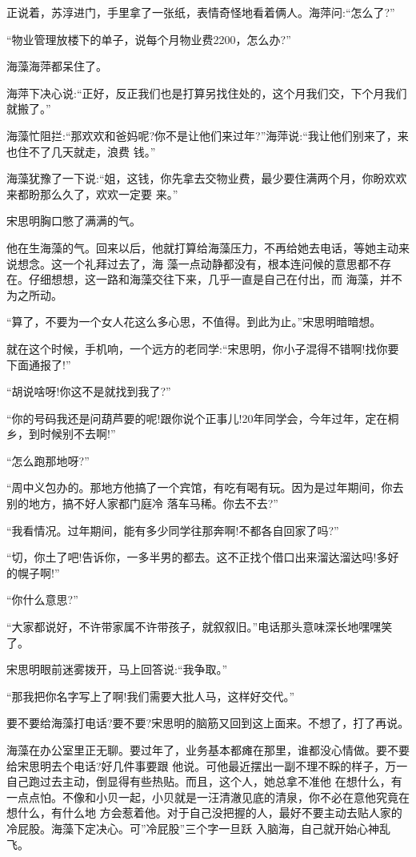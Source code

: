 \documentclass[11pt,a4paper,onecolumn]{article}
\begin{document}
正说着，苏淳进门，手里拿了一张纸，表情奇怪地看着俩人。海萍问:``怎么了?''

``物业管理放楼下的单子，说每个月物业费2200，怎么办?''

海藻海萍都呆住了。

海萍下决心说:``正好，反正我们也是打算另找住处的，这个月我们交，下个月我们就搬了。''

海藻忙阻拦:``那欢欢和爸妈呢?你不是让他们来过年?''海萍说:``我让他们别来了，来也住不了几天就走，浪费
钱。''

海藻犹豫了一下说:``姐，这钱，你先拿去交物业费，最少要住满两个月，你盼欢欢来都盼那么久了，欢欢一定要
来。''

宋思明胸口憋了满满的气。

他在生海藻的气。回来以后，他就打算给海藻压力，不再给她去电话，等她主动来说想念。这一个礼拜过去了，海
藻一点动静都没有，根本连问候的意思都不存在。仔细想想，这一路和海藻交往下来，几乎一直是自己在付出，而
海藻，并不为之所动。

``算了，不要为一个女人花这么多心思，不值得。到此为止。''宋思明暗暗想。

就在这个时候，手机响，一个远方的老同学:``宋思明，你小子混得不错啊!找你要下面通报了!''

``胡说啥呀!你这不是就找到我了?''

``你的号码我还是问葫芦要的呢!跟你说个正事儿!20年同学会，今年过年，定在桐乡，到时候别不去啊!''

``怎么跑那地呀?''

``周中义包办的。那地方他搞了一个宾馆，有吃有喝有玩。因为是过年期间，你去别的地方，搞不好人家都门庭冷
落车马稀。你去不去?''

``我看情况。过年期间，能有多少同学往那奔啊!不都各自回家了吗?''

``切，你土了吧!告诉你，一多半男的都去。这不正找个借口出来溜达溜达吗!多好的幌子啊!''

``你什么意思?''

``大家都说好，不许带家属不许带孩子，就叙叙旧。''电话那头意味深长地嘿嘿笑了。

宋思明眼前迷雾拨开，马上回答说:``我争取。''

``那我把你名字写上了啊!我们需要大批人马，这样好交代。''

要不要给海藻打电话?要不要?宋思明的脑筋又回到这上面来。不想了，打了再说。

海藻在办公室里正无聊。要过年了，业务基本都瘫在那里，谁都没心情做。要不要给宋思明去个电话?好几件事要跟
他说。可他最近摆出一副不理不睬的样子，万一自己跑过去主动，倒显得有些热贴。而且，这个人，她总拿不准他
在想什么，有一点点怕。不像和小贝一起，小贝就是一汪清澈见底的清泉，你不必在意他究竟在想什么，有什么地
方会惹着他。对于自己没把握的人，最好不要主动去贴人家的冷屁股。海藻下定决心。可''冷屁股''三个字一旦跃
入脑海，自己就开始心神乱飞。
\end{document}

